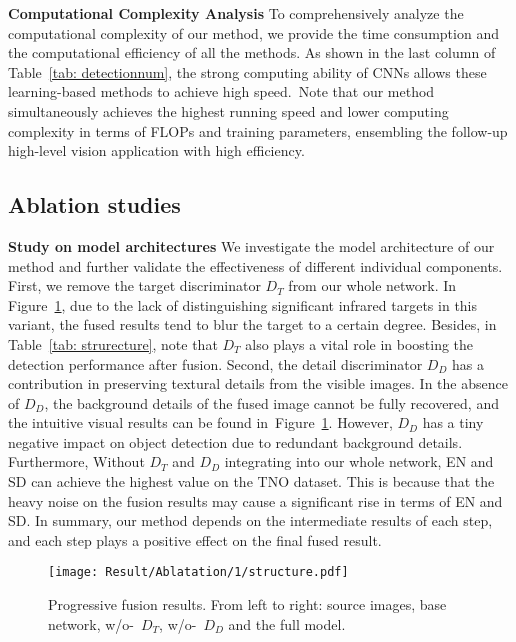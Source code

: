 \documentclass[10pt,twocolumn,letterpaper]{article}
\begin{document}
\noindent\textbf{Computational Complexity Analysis} 
To comprehensively analyze the computational complexity of our method, we provide the time consumption and the computational efficiency of all the methods. As shown in the last column of Table~\ref{tab: detectionnum}, the strong computing ability of CNNs allows these learning-based methods to achieve high speed.~Note that our method simultaneously achieves the highest running speed and lower computing complexity in terms of FLOPs and training parameters, ensembling the follow-up high-level vision application with high efficiency.

\subsection{Ablation studies}
\noindent\textbf{Study on model architectures}
We investigate the model architecture of our method and further validate the effectiveness of different individual components. First, we remove the target discriminator $D_T$ from our whole network. In Figure~\ref{fig:abstructure}, due to the lack of distinguishing significant infrared targets in this variant, the fused results tend to blur the target to a certain degree. Besides, in Table~\ref{tab: strurecture}, note that $D_T$ also plays a vital role in boosting the detection performance after fusion.  Second, the detail discriminator $D_D$ has a contribution in preserving textural details from the visible images. In the absence of $D_D$, the background details of the fused image cannot be fully recovered, and the intuitive visual results can be found in~Figure~\ref{fig:abstructure}.  However, $D_D$ has a tiny negative impact on object detection due to redundant background details.  Furthermore, Without $D_T$ and $D_D$ integrating into our whole network, EN and SD can achieve the highest value on the TNO dataset. This is because that the heavy noise on the fusion results may cause a significant rise in terms of EN and SD. In summary, our method depends on the intermediate results of each step, and each step plays a positive effect on the final fused result. 
\begin{figure}[!htb]
	\centering
	\setlength{\tabcolsep}{1pt} 
	
	\texttt{[image: Result/Ablatation/1/structure.pdf]}
	
	\caption{Progressive fusion results. From left to right: source images, base network, w/o-~$D_T$, w/o-~$D_D$ and the full model.}
	\label{fig:abstructure}
	\vspace{-0.5cm}  
\end{figure}
\end{document}
